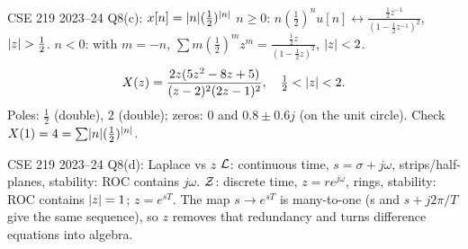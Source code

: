 \begin{example}{CSE 219 2023--24 Q8(c): $x[n]=\lvert n\rvert(\tfrac12)^{\lvert n\rvert}$}
$n\ge0$: $n(\tfrac12)^nu[n]\leftrightarrow\frac{\frac12z^{-1}}{(1-\frac12z^{-1})^2}$, $\lvert z\rvert>\tfrac12$. $n<0$: with $m=-n$, $\sum m(\tfrac12)^mz^m=\frac{\frac12z}{(1-\frac12z)^2}$, $\lvert z\rvert<2$.
\[X(z)=\frac{2z(5z^2-8z+5)}{(z-2)^2(2z-1)^2},\quad\tfrac12<\lvert z\rvert<2.\]
Poles: $\tfrac12$ (double), $2$ (double); zeros: $0$ and $0.8\pm0.6j$ (on the unit circle). Check $X(1)=4=\sum\lvert n\rvert(\tfrac12)^{\lvert n\rvert}$.
\end{example}
\begin{example}{CSE 219 2023--24 Q8(d): Laplace vs $z$}
$\mathcal{L}$: continuous time, $s=\sigma+j\omega$, strips/half-planes, stability: ROC contains $j\omega$. $\mathcal{Z}$: discrete time, $z=re^{j\omega}$, rings, stability: ROC contains $\lvert z\rvert=1$; $z=e^{sT}$. The map $s\to e^{sT}$ is many-to-one (s and $s+j2\pi/T$ give the same sequence), so $z$ removes that redundancy and turns difference equations into algebra.
\end{example}
